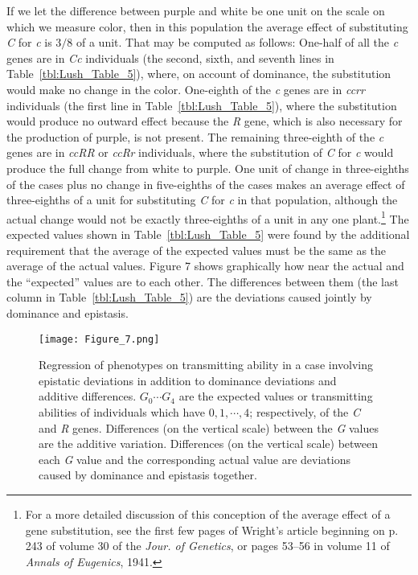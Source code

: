 {If we let the difference between purple and white be one unit on the scale on which
we measure color, then in this population the average effect of substituting
\textit{C} for \textit{c} is $3/8$ of a unit. That may be computed as follows:
One-half of all the \textit{c} genes are in \textit{Cc} individuals (the second,
sixth, and seventh lines in Table~\ref{tbl:Lush_Table_5}), where, on account of
dominance, the substitution would make no change in the color. One-eighth of the
\textit{c} genes are in \textit{ccrr} individuals (the first line in
Table~\ref{tbl:Lush_Table_5}), where the substitution would produce no outward effect
because the \textit{R} gene, which is also necessary for the production of purple, is
not present. The remaining three-eighth of the \textit{c} genes are in \textit{ccRR}
or \textit{ccRr} individuals, where the substitution of \textit{C} for \textit{c}
would produce the full change from white to purple. One unit of change in three-eighths
of the cases plus no change in five-eighths of the cases makes an average effect of
three-eighths of a unit for substituting \textit{C} for \textit{c} in that population,
although the actual change would not be exactly three-eighths of a unit in any one
plant.\footnote{For a more detailed discussion of this conception of the average effect of a
gene substitution, see the first few pages of Wright's article beginning on p. 243 of
volume 30 of the \textit{Jour. of Genetics}, or pages 53--56 in volume 11 of
\textit{Annals of Eugenics}, 1941.} The expected values shown in Table~\ref{tbl:Lush_Table_5}
were found by the additional requirement that the average of the expected values must
be the same as the average of the actual values. Figure 7 shows graphically how near the
actual and the ``expected'' values are to each other. The differences between them (the last
column in Table~\ref{tbl:Lush_Table_5}) are the deviations caused jointly by dominance and
epistasis.

\begin{figure}
	\centering
    \texttt{[image: Figure\_7.png]}
    \caption{Regression of phenotypes on transmitting ability in a case involving epistatic
			 deviations in addition to dominance deviations and additive differences.
			 $G_0 \cdots G_4$ are the expected values or transmitting abilities of
			 individuals which have $0, 1, \cdots, 4$; respectively, of the \textit{C}
			 and \textit{R} genes. Differences (on the vertical scale) between the
			\textit{G} values are the additive variation. Differences (on the vertical
			scale) between each \textit{G} value and the corresponding actual value are
			deviations caused by dominance and epistasis together.}
    \label{fig:Lush_Figure_7}
\end{figure}

}
